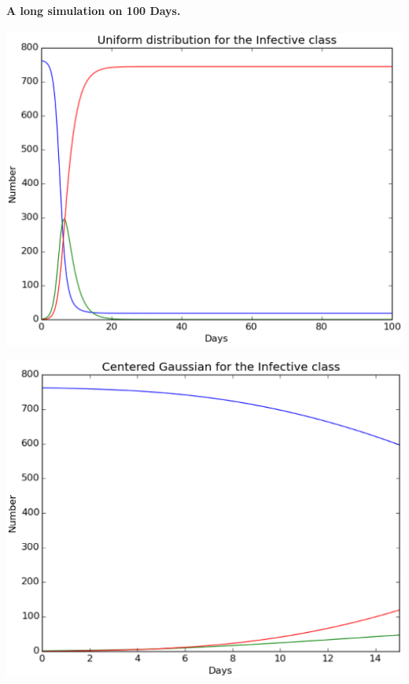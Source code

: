 \documentclass[%
twoside,                 %
final,                   %
10pt]{article}
\begin{document}
\paragraph{A long simulation on 100 Days.}
\begin{center}  %
  \centerline{\includegraphics[width=0.8\linewidth]{plots/2D_british_school_long_number.eps}}
\end{center}



\begin{center}  %
  \centerline{\includegraphics[width=0.8\linewidth]{plots/2D_british_school_gauss_long_number.eps}}
\end{center}
\end{document}

